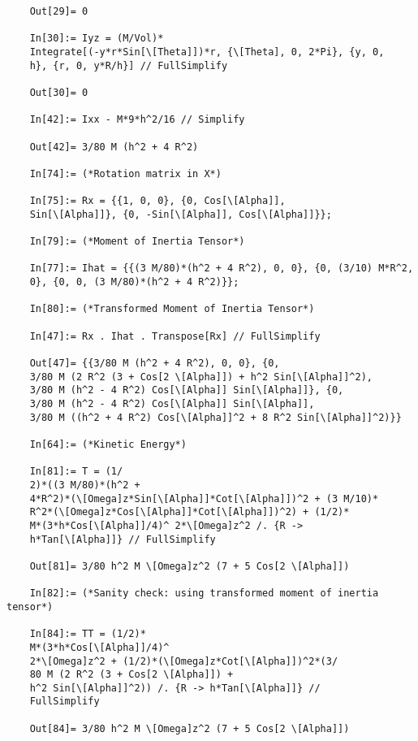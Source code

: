 \documentclass{article}
\theoremstyle{definition}
\begin{document}
\begin{enumerate}[label=(\alph*)]
\begin{lstlisting}
	Out[29]= 0
	
	In[30]:= Iyz = (M/Vol)*
	Integrate[(-y*r*Sin[\[Theta]])*r, {\[Theta], 0, 2*Pi}, {y, 0, 
	h}, {r, 0, y*R/h}] // FullSimplify
	
	Out[30]= 0
	
	In[42]:= Ixx - M*9*h^2/16 // Simplify
	
	Out[42]= 3/80 M (h^2 + 4 R^2)
	
	In[74]:= (*Rotation matrix in X*)
	
	In[75]:= Rx = {{1, 0, 0}, {0, Cos[\[Alpha]], 
	Sin[\[Alpha]]}, {0, -Sin[\[Alpha]], Cos[\[Alpha]]}};
	
	In[79]:= (*Moment of Inertia Tensor*)
	
	In[77]:= Ihat = {{(3 M/80)*(h^2 + 4 R^2), 0, 0}, {0, (3/10) M*R^2, 
	0}, {0, 0, (3 M/80)*(h^2 + 4 R^2)}};
	
	In[80]:= (*Transformed Moment of Inertia Tensor*)
	
	In[47]:= Rx . Ihat . Transpose[Rx] // FullSimplify
	
	Out[47]= {{3/80 M (h^2 + 4 R^2), 0, 0}, {0, 
	3/80 M (2 R^2 (3 + Cos[2 \[Alpha]]) + h^2 Sin[\[Alpha]]^2), 
	3/80 M (h^2 - 4 R^2) Cos[\[Alpha]] Sin[\[Alpha]]}, {0, 
	3/80 M (h^2 - 4 R^2) Cos[\[Alpha]] Sin[\[Alpha]], 
	3/80 M ((h^2 + 4 R^2) Cos[\[Alpha]]^2 + 8 R^2 Sin[\[Alpha]]^2)}}
	
	In[64]:= (*Kinetic Energy*)
	
	In[81]:= T = (1/
	2)*((3 M/80)*(h^2 + 
	4*R^2)*(\[Omega]z*Sin[\[Alpha]]*Cot[\[Alpha]])^2 + (3 M/10)*
	R^2*(\[Omega]z*Cos[\[Alpha]]*Cot[\[Alpha]])^2) + (1/2)*
	M*(3*h*Cos[\[Alpha]]/4)^ 2*\[Omega]z^2 /. {R -> 
	h*Tan[\[Alpha]]} // FullSimplify
	
	Out[81]= 3/80 h^2 M \[Omega]z^2 (7 + 5 Cos[2 \[Alpha]])
	
	In[82]:= (*Sanity check: using transformed moment of inertia tensor*)
	
	In[84]:= TT = (1/2)*
	M*(3*h*Cos[\[Alpha]]/4)^ 
	2*\[Omega]z^2 + (1/2)*(\[Omega]z*Cot[\[Alpha]])^2*(3/
	80 M (2 R^2 (3 + Cos[2 \[Alpha]]) + 
	h^2 Sin[\[Alpha]]^2)) /. {R -> h*Tan[\[Alpha]]} // 
	FullSimplify
	
	Out[84]= 3/80 h^2 M \[Omega]z^2 (7 + 5 Cos[2 \[Alpha]])
	\end{lstlisting}
\end{enumerate}


	
\end{document}
